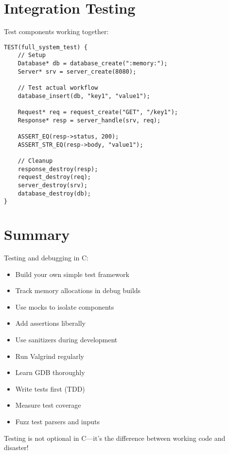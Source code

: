 \section{Integration Testing}

Test components working together:

\begin{lstlisting}
TEST(full_system_test) {
    // Setup
    Database* db = database_create(":memory:");
    Server* srv = server_create(8080);

    // Test actual workflow
    database_insert(db, "key1", "value1");

    Request* req = request_create("GET", "/key1");
    Response* resp = server_handle(srv, req);

    ASSERT_EQ(resp->status, 200);
    ASSERT_STR_EQ(resp->body, "value1");

    // Cleanup
    response_destroy(resp);
    request_destroy(req);
    server_destroy(srv);
    database_destroy(db);
}
\end{lstlisting}

\section{Summary}

Testing and debugging in C:

\begin{itemize}
    \item Build your own simple test framework
    \item Track memory allocations in debug builds
    \item Use mocks to isolate components
    \item Add assertions liberally
    \item Use sanitizers during development
    \item Run Valgrind regularly
    \item Learn GDB thoroughly
    \item Write tests first (TDD)
    \item Measure test coverage
    \item Fuzz test parsers and inputs
\end{itemize}

Testing is not optional in C---it's the difference between working code and disaster!
